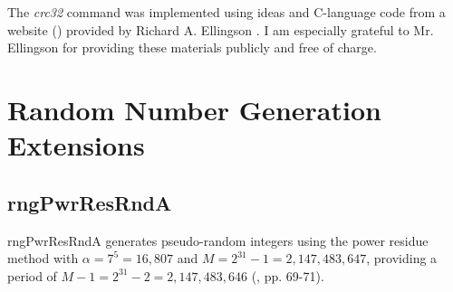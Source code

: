 \begin{tclcommandacknowledgements}
The \emph{crc32} command was implemented using ideas and C-language
code from a website (\cite{bibref:w:ellingsoncrc32pages})
provided by Richard A. Ellingson
\cite{bibref:i:richardaellingson}.  I am especially
grateful to Mr. Ellingson for providing these materials publicly
and free of charge.
\end{tclcommandacknowledgements}

\section{Random Number Generation Extensions}


\subsection{rngPwrResRndA}

\begin{tclcommandname}{rngPwrResRndA}%
generates pseudo-random integers using the power residue
method with $\alpha = 7^5 = 16,807$ and
$M = 2^{31}-1 = 2,147,483,647$, providing a period of $M - 1 = 2^{31}-2 = 2,147,483,646$
(\cite{bibref:b:LeonGarciaProb}, pp. 69-71).
\end{tclcommandname}

\begin{tclcommandsynopsis}
\end{tclcommandsynopsis}


